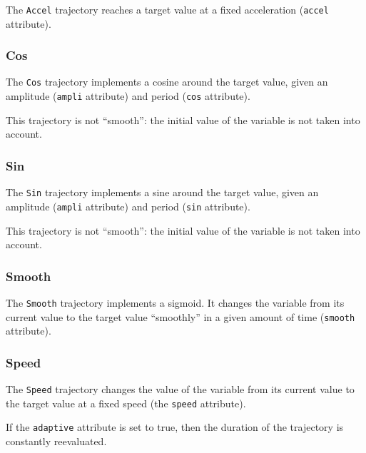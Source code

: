 The \lstinline{Accel} trajectory reaches a target value at a fixed
acceleration (\lstinline{accel} attribute).


\subsubsection{Cos}

The \lstinline{Cos} trajectory implements a cosine around the target
value, given an amplitude (\lstinline{ampli} attribute) and period
(\lstinline{cos} attribute).

This trajectory is not ``smooth'': the initial value of the variable
is not taken into account.


\subsubsection{Sin}

The \lstinline{Sin} trajectory implements a sine around the target
value, given an amplitude (\lstinline{ampli} attribute) and period
(\lstinline{sin} attribute).

This trajectory is not ``smooth'': the initial value of the variable
is not taken into account.


\subsubsection{Smooth}

The \lstinline{Smooth} trajectory implements a sigmoid.  It changes
the variable from its current value to the target value ``smoothly''
in a given amount of time (\lstinline{smooth} attribute).


\subsubsection{Speed}

The \lstinline{Speed} trajectory changes the value of the variable
from its current value to the target value at a fixed speed (the
\lstinline{speed} attribute).


If the \lstinline{adaptive} attribute is set to true, then the
duration of the trajectory is constantly reevaluated.

